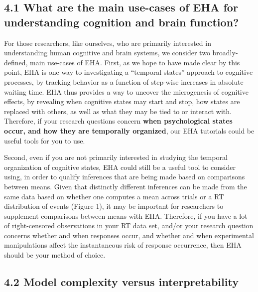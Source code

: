 \documentclass[
  man, donotrepeattitle,floatsintext]{apa6}
\begin{document}
\subsection{4.1 What are the main use-cases of EHA for understanding cognition and brain function?}\label{what-are-the-main-use-cases-of-eha-for-understanding-cognition-and-brain-function}

For those researchers, like ourselves, who are primarily interested in understanding human cognitive and brain systems, we consider two broadly-defined, main use-cases of EHA. First, as we hope to have made clear by this point, EHA is one way to investigating a ``temporal states'' approach to cognitive processes, by tracking behavior as a function of step-wise increases in absolute waiting time. EHA thus provides a way to uncover the microgenesis of cognitive effects, by revealing when cognitive states may start and stop, how states are replaced with others, as well as what they may be tied to or interact with. Therefore, if your research questions concern \textbf{when psychological states occur, and how they are temporally organized}, our EHA tutorials could be useful tools for you to use.

Second, even if you are not primarily interested in studying the temporal organization of cognitive states, EHA could still be a useful tool to consider using, in order to qualify inferences that are being made based on comparisons between means. Given that distinctly different inferences can be made from the same data based on whether one computes a mean across trials or a RT distribution of events (Figure 1), it may be important for researchers to supplement comparisons between means with EHA.
Therefore, if you have a lot of right-censored observations in your RT data set, and/or your research question concerns whether and when responses occur, and whether and when experimental manipulations affect the instantaneous risk of response occurrence, then EHA should be your method of choice.

\subsection{4.2 Model complexity versus interpretability}\label{model-complexity-versus-interpretability}
\end{document}
